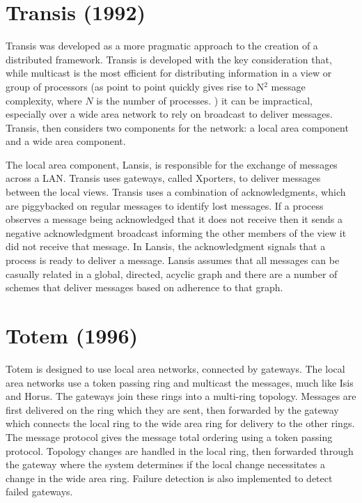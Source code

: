 \section{Transis (1992)}

Transis \cite{TRANSISTOOLKIT} was developed as a more pragmatic approach to the creation of a distributed framework. Transis is developed with the key consideration that, while multicast is the most efficient for distributing information in a view or group of processors (as point to point quickly gives rise to N$^{2}$ message complexity, where $N$ is the number of processes. ) it can be impractical, especially over a wide area network to rely on broadcast to deliver messages. Transis, then considers two components for the network: a local area component and a wide area component.

The local area component, Lansis, is responsible for the exchange of messages across a LAN. Transis uses gateways, called Xporters, to deliver messages between the local views. Transis uses a combination of acknowledgments, which are piggybacked on regular messages to identify lost messages. If a process observes a message being acknowledged that it does not receive then it sends a negative acknowledgment broadcast informing the other members of the view it did not receive that message. In Lansis, the acknowledgment signals that a process is ready to deliver a message. Lansis assumes that all messages can be casually related in a global, directed, acyclic graph and there are a number of schemes that deliver messages based on adherence to that graph.

 

\section{Totem (1996)}

Totem\cite{TOTEMTOOLKIT} is designed to use local area networks, connected by gateways. The local area networks use a token passing ring and multicast the messages, much like Isis and Horus. The gateways join these rings into a multi-ring topology. Messages are first delivered on the ring which they are sent, then forwarded by the gateway which connects the local ring to the wide area ring for delivery to the other rings. The message protocol gives the message total ordering using a token passing protocol. Topology changes are handled in the local ring, then forwarded through the gateway where the system determines if the local change necessitates a change in the wide area ring. Failure detection is also implemented to detect failed gateways.
                                             
